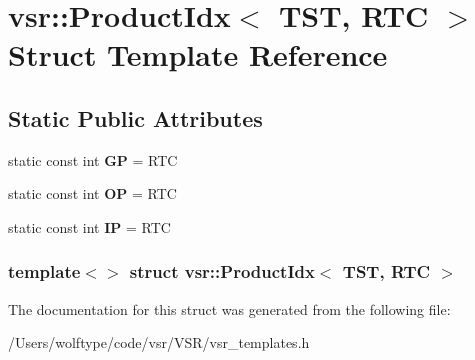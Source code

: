 \hypertarget{structvsr_1_1_product_idx_3_01_t_s_t_00_01_r_t_c_01_4}{\section{vsr\-:\-:Product\-Idx$<$ T\-S\-T, R\-T\-C $>$ Struct Template Reference}
\label{structvsr_1_1_product_idx_3_01_t_s_t_00_01_r_t_c_01_4}
}
\subsection*{Static Public Attributes}
\begin{DoxyCompactItemize}
\item 
\hypertarget{structvsr_1_1_product_idx_3_01_t_s_t_00_01_r_t_c_01_4_aae831aaeeb2989fbd0e590e2e2e545b6}{static const int {\bfseries G\-P} = R\-T\-C}\label{structvsr_1_1_product_idx_3_01_t_s_t_00_01_r_t_c_01_4_aae831aaeeb2989fbd0e590e2e2e545b6}

\item 
\hypertarget{structvsr_1_1_product_idx_3_01_t_s_t_00_01_r_t_c_01_4_a71ac92c84b5e2e59a6b97b47f14e5522}{static const int {\bfseries O\-P} = R\-T\-C}\label{structvsr_1_1_product_idx_3_01_t_s_t_00_01_r_t_c_01_4_a71ac92c84b5e2e59a6b97b47f14e5522}

\item 
\hypertarget{structvsr_1_1_product_idx_3_01_t_s_t_00_01_r_t_c_01_4_a316e0bbc9d968c2b5f07c24b1b64bd07}{static const int {\bfseries I\-P} = R\-T\-C}\label{structvsr_1_1_product_idx_3_01_t_s_t_00_01_r_t_c_01_4_a316e0bbc9d968c2b5f07c24b1b64bd07}

\end{DoxyCompactItemize}
\subsubsection*{template$<$$>$ struct vsr\-::\-Product\-Idx$<$ T\-S\-T, R\-T\-C $>$}



The documentation for this struct was generated from the following file\-:\begin{DoxyCompactItemize}
\item 
/\-Users/wolftype/code/vsr/\-V\-S\-R/vsr\-\_\-templates.\-h\end{DoxyCompactItemize}
